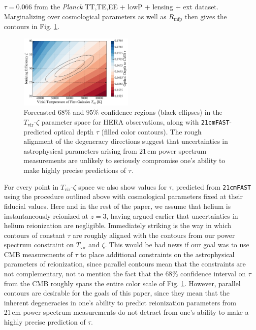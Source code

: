\documentclass[twocolumn,aps,prd,nofootinbib,showpacs,superscriptaddress]{revtex4-1}
\begin{document}
$\tau =0.066$ from the \emph{Planck} TT,TE,EE + lowP + lensing + ext dataset. Marginalizing over cosmological parameters as well as $R_\textrm{mfp}$ then gives the contours in Fig. \ref{fig:21cmDegen_wTau}.

\begin{figure}[!]
	\centering
	\includegraphics[width=0.5\textwidth]{figures/21cmDegen_wTau.pdf}
	\caption{Forecasted $68\%$ and $95\%$ confidence regions (black ellipses) in the $T_\textrm{vir}$-$\zeta$ parameter space for HERA observations, along with {\tt 21cmFAST}-predicted optical depth $\tau$ (filled color contours). The rough alignment of the degeneracy directions suggest that uncertainties in astrophysical parameters arising from $21\,\textrm{cm}$ power spectrum measurements are unlikely to seriously compromise one's ability to make highly precise predictions of $\tau$.}
	\label{fig:21cmDegen_wTau}
\end{figure}

For every point in $T_\textrm{vir}$-$\zeta$ space we also show values for $\tau$, predicted from {\tt 21cmFAST} using the procedure outlined above with cosmological parameters fixed at their fiducial values. Here and in the rest of the paper, we assume that helium is instantaneously reionized at $z = 3$, having argued earlier that uncertainties in helium reionization are negligible. Immediately striking is the way in which contours of constant $\tau$ are roughly aligned with the contours from our power spectrum constraint on $T_\textrm{vir}$ and $\zeta$. This would be bad news if our goal was to use CMB measurements of $\tau$ to place additional constraints on the astrophysical parameters of reionization, since parallel contours mean that the constraints are not complementary, not to mention the fact that the $68\%$ confidence interval on $\tau$ from the CMB roughly spans the entire color scale of Fig. \ref{fig:21cmDegen_wTau}. However, parallel contours are desirable for the goals of this paper, since they mean that the inherent degeneracies in one's ability to predict reionization parameters from $21\,\textrm{cm}$ power spectrum measurements do not detract from one's ability to make a highly precise prediction of $\tau$.
\end{document}
